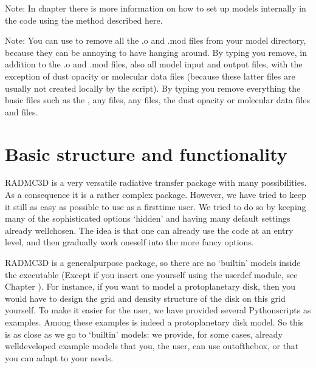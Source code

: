 \documentclass[letterpaper,10pt,english]{sphinxmanual}
\begin{document}
Note: In chapter {\hyperref[\detokenize{internalsetup:chap-internal-setup}]{}} there is more information on how to
set up models internally in the code using the method described here.

Note: You can use  to remove all the .o and .mod files from your
model directory, because they can be annoying to have hanging around. By typing
 you remove, in addition to the .o and .mod files, also all
model input and output files, with the exception of dust opacity or molecular
data files (because these latter files are usually not created locally by the
 script). By typing  you remove everything
 the basic files such as the , any  files, any
 files, the dust opacity or molecular data files and  files.


\chapter{Basic structure and functionality}
\label{\detokenize{basicstructure:basic-structure-and-functionality}}\label{\detokenize{basicstructure:chap-basic-struct-and-func}}\label{\detokenize{basicstructure::doc}}
RADMC\sphinxhyphen{}3D is a very versatile radiative transfer package with many
possibilities. As a consequence it is a rather complex package. However, we
have tried to keep it still as easy as possible to use as a first\sphinxhyphen{}time
user. We tried to do so by keeping many of the sophisticated options
‘hidden’ and having many default settings already well\sphinxhyphen{}chosen. The idea is
that one can already use the code at an entry level, and then gradually work
oneself into the more fancy options.

RADMC\sphinxhyphen{}3D is a general\sphinxhyphen{}purpose package, so there are no ‘built\sphinxhyphen{}in’ models
inside the  executable (Except if you insert one yourself
using the userdef module, see Chapter {\hyperref[\detokenize{internalsetup:chap-internal-setup}]{}}).  For
instance, if you want to model a protoplanetary disk, then you would have to
design the grid and density structure of the disk on this grid yourself. To
make it easier for the user, we have provided several Python\sphinxhyphen{}scripts as
examples. Among these examples is indeed a protoplanetary disk model. So
this is as close as we go to ‘built\sphinxhyphen{}in’ models: we provide, for some cases,
already well\sphinxhyphen{}developed example models that you, the user, can use
out\sphinxhyphen{}of\sphinxhyphen{}the\sphinxhyphen{}box, or that you can adapt to your needs.
\end{document}
